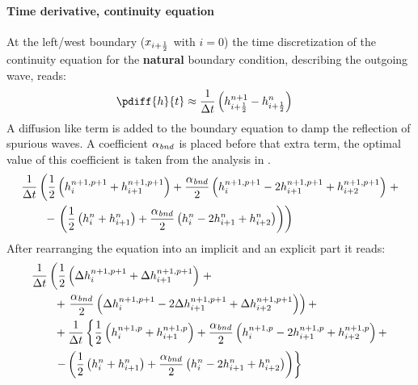 \paragraph*{Time derivative, continuity equation}
At the left/west boundary ($x_{i+\frac{1}{2}}$ with $i=0$) the time discretization of the continuity equation for the \textbf{natural} boundary condition, describing the outgoing wave, reads:
\begin{align}
    \pdiff{h}{t} & \approx \frac{1}{\Dt} \left(  h^{n+1}_{i+\half} - h^{n}_{i+\half} \right)
\end{align}
A diffusion like term is added to the boundary equation to damp the reflection of spurious waves.
A coefficient $\alpha_{\it bnd}$ is placed before that extra term, the optimal value of this coefficient is taken from the analysis in \citet{transpeq-analysisdiscretizationinsidedomain_boundaries.mw}.
\begin{align}
    & \frac{1}{\Delta t}\left( \frac{1}{2} \left( h^{n+1,p+1}_{i} + h^{n+1,p+1}_{i+1} \right)
    + \frac{\alpha_{\it bnd}}{2} \left( h^{n+1,p+1}_{i} - 2 h^{n+1,p+1}_{i+1} + h^{n+1,p+1}_{i+2}  \right) \right. +
    \nonumber \\*
    & \qquad  - \left. \left(
    \frac{1}{2} \left( h^{n}_{i} + h^{n}_{i+1} \right)
    + \frac{\alpha_{\it bnd}}{2}  \left( h^{n}_{i} - 2 h^{n}_{i+1} + h^{n}_{i+2}  \right) \right)
    \right)
\end{align}
After rearranging the equation into an implicit and an explicit part it reads:
\begin{align}
    & \frac{1}{\Delta t}  \left( \frac{1}{2} \left( \Delta h^{n+1, p+1}_{i} + \Delta h^{n+1, p+1}_{i+1} \right) \right. +
    \nonumber \\*
    & \qquad + \left. \frac{\alpha_{\it bnd}}{2}\left( \Delta h^{n+1,p+1}_{i} - 2 \Delta h^{n+1,p+1}_{i+1} + \Delta h^{n+1,p+1}_{i+2} \right) \right) +
    \nonumber \\
    & \qquad + \frac{1}{\Delta t} \left\{ \frac{1}{2} \left( h^{n+1, p}_{i} + h^{n+1, p}_{i+1} \right)
    + \frac{\alpha_{\it bnd}}{2}\left(  h^{n+1,p}_{i} - 2 h^{n+1,p}_{i+1}  + h^{n+1,p}_{i+2} \right) + \right.
    \nonumber \\*
    &
    \qquad \left. - \left( \frac{1}{2} \left( h^{n}_{i} + h^{n}_{i+1} \right)
    + \frac{\alpha_{\it bnd}}{2}  \left( h^{n}_{i} - 2 h^{n}_{i+1} + h^{n}_{i+2}  \right) \right) \right\}
\end{align}


